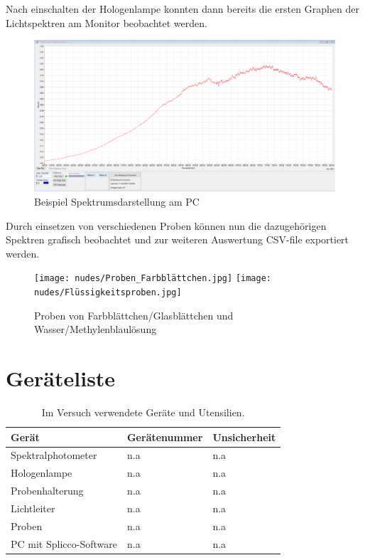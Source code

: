 \documentclass[12pt,a4paper,twoside]{article}
\begin{document}
\noindent
Nach einschalten der Hologenlampe konnten dann bereits die ersten Graphen der Lichtspektren am Monitor beobachtet werden. 

\begin{figure}[H]
    \centering
    \includegraphics[width=0.6\linewidth]{nudes/Verlauf-Referenzspektrum.PNG}
    \caption{Beispiel Spektrumsdarstellung am PC}
    \label{fig:SpliccoSoftware}
\end{figure}

\noindent
Durch einsetzen von verschiedenen Proben können nun die dazugehörigen Spektren grafisch beobachtet und zur weiteren Auswertung CSV-file exportiert werden.

\begin{figure}[H]
    \centering
    \texttt{[image: nudes/Proben\_Farbblättchen.jpg]}
    \texttt{[image: nudes/Flüssigkeitsproben.jpg]}
    \caption{Proben von Farbblättchen/Glasblättchen und Wasser/Methylenblaulösung}
    \label{fig:Proben}
\end{figure}


    
\section{Geräteliste} %

\begin{table}[H]
    \centering
    \caption{Im Versuch verwendete Geräte und Utensilien.}
    \label{tab:geraete}
    \begin{tabular}{| l | l | l |}
        \hline
        Gerät   & Gerätenummer  & Unsicherheit \\
        \hline
        Spektralphotometer & {n.a} & {n.a} \\
        Hologenlampe & {n.a} & {n.a} \\
        Probenhalterung & {n.a} & {n.a} \\
        Lichtleiter & {n.a} & {n.a} \\
        Proben & {n.a} & {n.a} \\
        PC mit Splicco-Software & {n.a} & {n.a} \\
        \hline
    \end{tabular}
\end{table}
\end{document}
